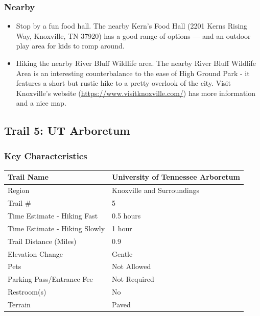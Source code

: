\documentclass[
  letterpaper,
  DIV=11,
  numbers=noendperiod]{scrartcl}
\providecommand{\tightlist}{%
  \setlength{\itemsep}{0pt}\setlength{\parskip}{0pt}}\usepackage{longtable,booktabs,array}
\begin{document}
\hypertarget{nearby-3}{%
\subsubsection{Nearby}\label{nearby-3}}

\begin{itemize}
\tightlist
\item
  Stop by a fun food hall. The nearby Kern's Food Hall (2201 Kerns
  Rising Way, Knoxville, TN 37920) has a good range of options --- and
  an outdoor play area for kids to romp around.
\item
  Hiking the nearby River Bluff Wildlife area. The nearby River Bluff
  Wildlife Area is an interesting counterbalance to the ease of High
  Ground Park - it features a short but rustic hike to a pretty overlook
  of the city. Visit Knoxville's website
  (\url{https://www.visitknoxville.com/}) has more information and a
  nice map.
\end{itemize}

\hypertarget{trail-5-ut-arboretum}{%
\subsection{Trail 5: UT Arboretum}\label{trail-5-ut-arboretum}}

\hypertarget{key-characteristics-4}{%
\subsubsection{Key Characteristics}\label{key-characteristics-4}}

\begin{longtable}[]{@{}ll@{}}
\toprule\noalign{}
Trail Name & University of Tennessee Arboretum \\
\midrule\noalign{}
\endhead
\bottomrule\noalign{}
\endlastfoot
Region & Knoxville and Surroundings \\
Trail \# & 5 \\
Time Estimate - Hiking Fast & 0.5 hours \\
Time Estimate - Hiking Slowly & 1 hour \\
Trail Distance (Miles) & 0.9 \\
Elevation Change & Gentle \\
Pets & Not Allowed \\
Parking Pass/Entrance Fee & Not Required \\
Restroom(s) & No \\
Terrain & Paved \\
\end{longtable}
\end{document}
